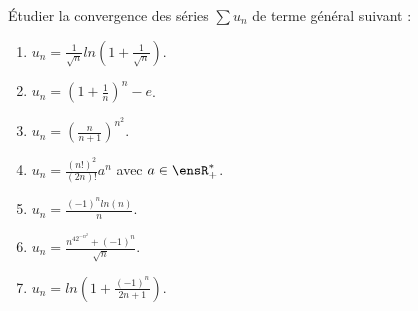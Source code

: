 \noindent Étudier la convergence des séries $\sum u_n$ de terme général suivant :

\begin{enumerate}
    \item $\displaystyle u_n = \frac{1}{\sqrt{n}} ln(1 + \frac{1}{\sqrt{n}})$.
    \item $\displaystyle u_n = (1 + \frac{1}{n})^n - e$.
    \item $\displaystyle u_n = (\frac{n}{n + 1})^{n^2}$.
    \item $\displaystyle u_n = \frac{(n!)^2}{(2n)!} a^n$ avec $a \in \ensR_+^*$.
    \item $\displaystyle u_n = \frac{(-1)^n ln(n)}{n}$.
    \item $\displaystyle u_n = \frac{n^42^{-n^2} + (-1)^n}{\sqrt{n}}$.
    \item $\displaystyle u_n = ln(1 + \frac{(-1)^n}{2n + 1})$.
\end{enumerate}